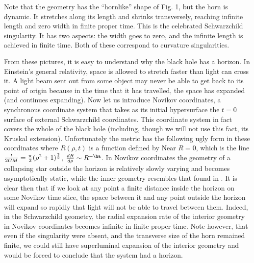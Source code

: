 Note that the geometry has the ``hornlike'' shape
of Fig. 1, but the horn is dynamic.  It stretches along its length and shrinks
transversely, reaching infinite length and zero width in finite proper time.
This is the celebrated Schwarzchild singularity.  It has two aspects: the width
goes to zero, and the infinite length is achieved in finite time.  Both of
these
correspond to curvature singularities.

{}From these pictures, it is easy to understand why the black hole has a
horizon.
In Einstein's general relativity, space is allowed to stretch faster than
light can cross it.
A light beam sent out from some object may never be able to get back to its
point of origin
because in the time that it has travelled, the space has expanded (and
continues expanding).
Now let us introduce Novikov coordinates, a synchronous coordinate system
that takes
as its initial hypersurface the $t=0$ surface of external Schwarzchild
coordinates.
This coordinate system in fact covers the whole of the black hole (including,
though
we will not use this fact, its Kruskal extension).  Unfortunately the metric
has the
following ugly form in these coordinates
\eqn{}
where $R(\rho ,t)$ is a function defined by
\eqn{}
Near $R=0$, which is the line ${t\over 2GM} = {\pi\over 2}
(\rho^2 + 1)^{3\over 2}$, ${dR\over d\rho}\sim R^{-\ha}$.
In Novikov coordinates the geometry of a collapsing star outside the horizon is
relatively slowly varying and becomes asymptotically static, while the inner
geometry
resembles that found in \killingmet .  It is clear then that if we look at
any point
a finite distance inside the horizon on some Novikov time slice, the space
between
it and any point outside the horizon will expand so rapidly that light will
not be able
to travel between them.  Indeed, in the Schwarzchild geometry, the radial
expansion rate
of the interior geometry in Novikov coordinates becomes infinite in finite
proper time.
Note however, that even if the singularity were absent, and the transverse size
of
the horn remained finite, we could still have superluminal expansion of the
interior
geometry and would be forced to conclude that the system had a horizon.

